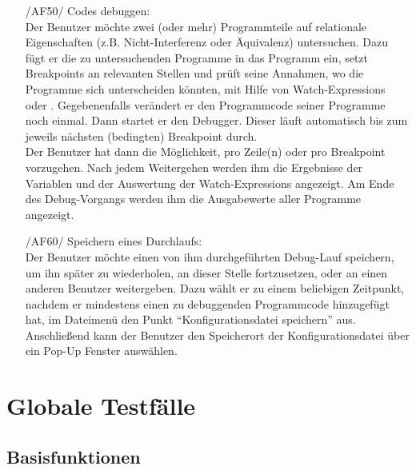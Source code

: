 \documentclass[parskip=full]{scrartcl}
\let\glsplgen\glsuseri
\begin{document}
\begin{itemize}
    \item [/AF50/] Codes debuggen: \\
			Der Benutzer möchte zwei (oder mehr) Programmteile auf relationale Eigenschaften (z.B. Nicht-Interferenz oder Äquivalenz) untersuchen. Dazu fügt er die zu untersuchenden Programme in das Programm ein, setzt \glspl{Breakpoint} an relevanten Stellen und prüft seine Annahmen, wo die Programme sich unterscheiden könnten, mit Hilfe von \glspl{Watch-Expression} oder \glsplgen{bedingter Breakpoint}. Gegebenenfalls verändert er den Programmcode seiner Programme noch einmal. Dann startet er den \gls{Debugger}. Dieser läuft automatisch bis zum jeweils nächsten (bedingten) \gls{Breakpoint} durch. \\Der Benutzer hat dann die Möglichkeit, pro Zeile(n) oder pro \gls{Breakpoint} vorzugehen. Nach jedem Weitergehen werden ihm die Ergebnisse der Variablen und der Auswertung der \glspl{Watch-Expression} angezeigt. Am Ende des Debug-Vorgangs werden ihm die Ausgabewerte aller Programme angezeigt.
    
    \item [/AF60/] Speichern eines Durchlaufs: \\
    Der Benutzer möchte einen von ihm durchgeführten Debug-Lauf speichern, um ihn später zu wiederholen, an dieser Stelle fortzusetzen, oder an einen anderen Benutzer weitergeben. Dazu wählt er zu einem beliebigen Zeitpunkt, nachdem er mindestens einen zu debuggenden Programmcode hinzugefügt hat, im Dateimenü den Punkt \enquote{\gls{Konfigurationsdatei} speichern} aus. Anschließend kann der Benutzer den Speicherort der \gls{Konfigurationsdatei} über ein Pop-Up Fenster auswählen.\\

\end{itemize}
\section{Globale Testfälle}

\subsection{Basisfunktionen}
\end{document}
